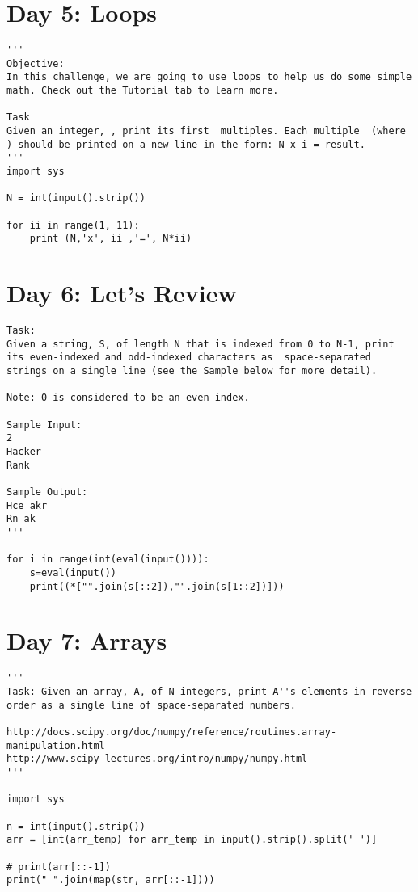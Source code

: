 \documentclass[11pt,a4paper]{article}
\begin{document}
\newpage
\section{Day 5: Loops}
\begin{lstlisting}
'''
Objective: 
In this challenge, we are going to use loops to help us do some simple math. Check out the Tutorial tab to learn more.

Task 
Given an integer, , print its first  multiples. Each multiple  (where ) should be printed on a new line in the form: N x i = result.
'''
import sys

N = int(input().strip())

for ii in range(1, 11):
    print (N,'x', ii ,'=', N*ii)

\end{lstlisting}


\newpage
\section{Day 6: Let's Review}
\begin{lstlisting}
Task:
Given a string, S, of length N that is indexed from 0 to N-1, print its even-indexed and odd-indexed characters as  space-separated strings on a single line (see the Sample below for more detail).

Note: 0 is considered to be an even index.

Sample Input:
2
Hacker
Rank

Sample Output:
Hce akr
Rn ak
'''

for i in range(int(eval(input()))):
    s=eval(input())
    print((*["".join(s[::2]),"".join(s[1::2])]))

\end{lstlisting}


\newpage
\section{Day 7: Arrays}
\begin{lstlisting}
'''
Task: Given an array, A, of N integers, print A''s elements in reverse order as a single line of space-separated numbers. 

http://docs.scipy.org/doc/numpy/reference/routines.array-manipulation.html
http://www.scipy-lectures.org/intro/numpy/numpy.html
'''

import sys

n = int(input().strip())
arr = [int(arr_temp) for arr_temp in input().strip().split(' ')]

# print(arr[::-1])
print(" ".join(map(str, arr[::-1])))
\end{lstlisting}
\end{document}
